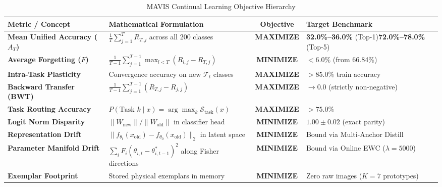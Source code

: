\documentclass[11pt,a4paper]{article}
\begin{document}
    \begin{table}[h!]
    \centering
    \small
    \renewcommand{\arraystretch}{1.3}
    \caption{MAVIS Continual Learning Objective Hierarchy}
    \label{tab:objectives}
    \begin{tabularx}{\textwidth}{p{4.2cm} p{4.2cm} c p{4cm}}
    \toprule
    \textbf{Metric / Concept} & \textbf{Mathematical Formulation} & \textbf{Objective} & \textbf{Target Benchmark} \\
    \midrule
    \textbf{Mean Unified Accuracy ($A_T$)} & $\frac{1}{T} \sum_{j=1}^{T} R_{T, j}$ across all 200 classes & \textbf{MAXIMIZE} & \textbf{32.0\%--36.0\%} (Top-1)\newline \textbf{72.0\%--78.0\%} (Top-5) \\
    \textbf{Average Forgetting ($F$)} & $\frac{1}{T-1} \sum_{j=1}^{T-1} \max_{l < T} (R_{l, j} - R_{T, j})$ & \textbf{MINIMIZE} & \textbf{$< 6.0\%$} (from 66.84\%) \\
    \textbf{Intra-Task Plasticity} & Convergence accuracy on new $\mathcal{T}_t$ classes & \textbf{MAXIMIZE} & \textbf{$> 85.0\%$} train accuracy \\
    \textbf{Backward Transfer (BWT)} & $\frac{1}{T-1} \sum_{j=1}^{T-1} (R_{T, j} - R_{j, j})$ & \textbf{MAXIMIZE} & $\to 0.0$ (strictly non-negative) \\
    \textbf{Task Routing Accuracy} & $P(\text{Task } k \mid x) = \arg\max_k \mathcal{S}_{\text{task}}(x)$ & \textbf{MAXIMIZE} & \textbf{$> 75.0\%$} \\
    \textbf{Logit Norm Disparity} & $\|W_{\text{new}}\| / \|W_{\text{old}}\|$ in classifier head & \textbf{MINIMIZE} & $\mathbf{1.00 \pm 0.02}$ (exact parity) \\
    \textbf{Representation Drift} & $\|f_{\theta_t}(x_{\text{old}}) - f_{\theta_0}(x_{\text{old}})\|_2$ in latent space & \textbf{MINIMIZE} & Bound via Multi-Anchor Distill \\
    \textbf{Parameter Manifold Drift} & $\sum_i F_i (\theta_{i, t} - \theta_{i, t-1}^*)^2$ along Fisher directions & \textbf{MINIMIZE} & Bound via Online EWC ($\lambda=5000$) \\
    \textbf{Exemplar Footprint} & Stored physical exemplars in memory & \textbf{MINIMIZE} & Zero raw images ($K=7$ prototypes) \\
    \bottomrule
    \end{tabularx}
    \end{table}

    \newpage

\end{document}
